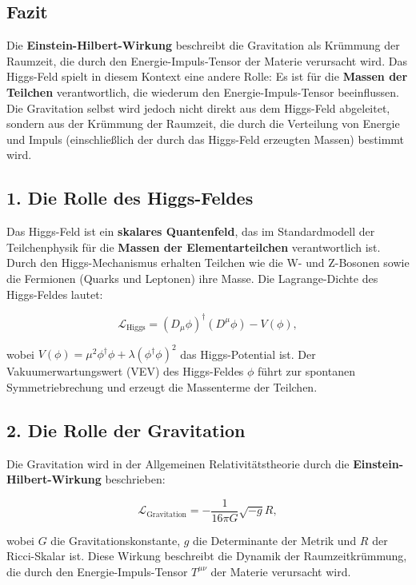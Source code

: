 \documentclass{article}
\begin{document}
	\subsection{Fazit}
	
	
	Die \textbf{Einstein-Hilbert-Wirkung} beschreibt die Gravitation als Krümmung der Raumzeit, die durch den Energie-Impuls-Tensor der Materie verursacht wird. Das Higgs-Feld spielt in diesem Kontext eine andere Rolle: Es ist für die \textbf{Massen der Teilchen} verantwortlich, die wiederum den Energie-Impuls-Tensor beeinflussen. Die Gravitation selbst wird jedoch nicht direkt aus dem Higgs-Feld abgeleitet, sondern aus der Krümmung der Raumzeit, die durch die Verteilung von Energie und Impuls (einschließlich der durch das Higgs-Feld erzeugten Massen) bestimmt wird.
	
	\subsection{1. Die Rolle des Higgs-Feldes}
	
	Das Higgs-Feld ist ein \textbf{skalares Quantenfeld}, das im Standardmodell der Teilchenphysik für die \textbf{Massen der Elementarteilchen} verantwortlich ist. Durch den Higgs-Mechanismus erhalten Teilchen wie die W- und Z-Bosonen sowie die Fermionen (Quarks und Leptonen) ihre Masse. Die Lagrange-Dichte des Higgs-Feldes lautet:
	
	\[
	\mathcal{L}_\text{Higgs} = (D_\mu \phi)^\dagger (D^\mu \phi) - V(\phi),
	\]
	
	wobei $V(\phi) = \mu^2 \phi^\dagger \phi + \lambda (\phi^\dagger \phi)^2$ das Higgs-Potential ist. Der Vakuumerwartungswert (VEV) des Higgs-Feldes $\phi$ führt zur spontanen Symmetriebrechung und erzeugt die Massenterme der Teilchen.
	
	\subsection{2. Die Rolle der Gravitation}
	
	Die Gravitation wird in der Allgemeinen Relativitätstheorie durch die \textbf{Einstein-Hilbert-Wirkung} beschrieben:
	
	\[
	\mathcal{L}_\text{Gravitation} = -\frac{1}{16\pi G} \sqrt{-g} R,
	\]
	
	wobei $G$ die Gravitationskonstante, $g$ die Determinante der Metrik und $R$ der Ricci-Skalar ist. Diese Wirkung beschreibt die Dynamik der Raumzeitkrümmung, die durch den Energie-Impuls-Tensor $T^{\mu\nu}$ der Materie verursacht wird.
	
\end{document}

